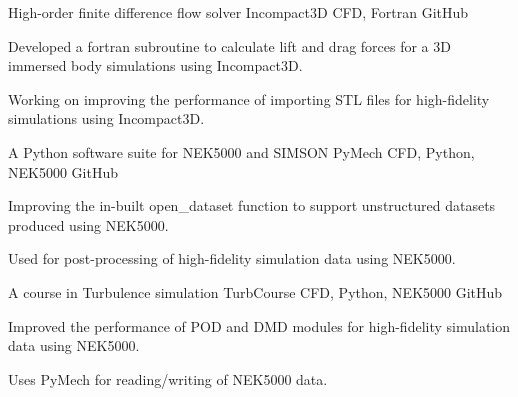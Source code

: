 

\begin{cventries}
  \cventry
  {High-order finite difference flow solver} %
  {Incompact3D} %
  {CFD, Fortran} %
  {GitHub} %
  {
    \begin{cvitems} %
      \item {Developed a fortran subroutine to calculate lift and drag forces for a 3D immersed body simulations using Incompact3D.}
      \item {Working on improving the performance of importing STL files for high-fidelity simulations using Incompact3D.}
    \end{cvitems}
  }

  \cventry
  {A Python software suite for NEK5000 and SIMSON} %
  {PyMech} %
  {CFD, Python, NEK5000} %
  {GitHub} %
  {
    \begin{cvitems} %
      \item {Improving the in-built open\_dataset function to support unstructured datasets produced using NEK5000.}
      \item {Used for post-processing of high-fidelity simulation data using NEK5000.}
    \end{cvitems}
  }

  \cventry
  {A course in Turbulence simulation} %
  {TurbCourse} %
  {CFD, Python, NEK5000} %
  {GitHub} %
  {
    \begin{cvitems} %
      \item {Improved the performance of POD and DMD modules for high-fidelity simulation data using NEK5000.}
      \item {Uses PyMech for reading/writing of NEK5000 data.}
    \end{cvitems}
  }


\end{cventries}
